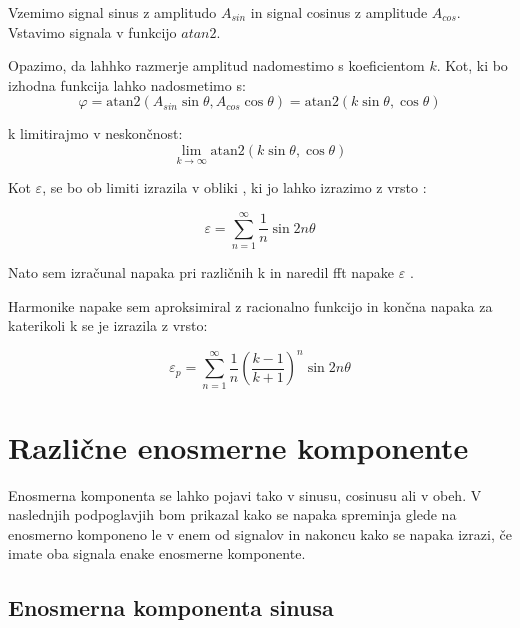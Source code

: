 Vzemimo signal sinus z amplitudo $A_{sin}$ in signal cosinus z amplitude $A_{cos}$. Vstavimo signala v funkcijo $atan2$.

Opazimo, da lahhko razmerje amplitud nadomestimo s koeficientom $k$. Kot, ki bo izhodna funkcija lahko nadosmetimo s:
\begin{equation}
\varphi =  \mathrm{atan2}(A_{sin} \sin{\theta}, A_{cos} \cos{\theta}) = \mathrm{atan2}(k \sin{\theta},\cos{\theta})
\end{equation}

k limitirajmo v neskončnost:
\begin{equation}
\lim_{k \rightarrow \infty} \mathrm{atan2}(k \sin{\theta},\cos{\theta})
\end{equation}


Kot $\varepsilon$, se bo ob limiti  izrazila v obliki , ki jo lahko izrazimo z vrsto \cite{fourierova_vrsta}:

\begin{equation}
\varepsilon = \sum_{n=1}^{\infty}\frac{1}{n} \sin 2 n \theta
\end{equation}

Nato sem izračunal napaka pri različnih k in naredil fft napake $\varepsilon$ \cite{matlab_fft}.

Harmonike napake sem aproksimiral z racionalno funkcijo in končna napaka za katerikoli k se je izrazila z vrsto:

\begin{equation}
\label{vrsta_k}
\varepsilon_p =\sum_{n=1}^{\infty}\frac{1}{n}(\frac{k-1}{k+1})^n \sin 2 n \theta
\end{equation}

\newpage
\section{Različne enosmerne komponente}

Enosmerna komponenta se lahko pojavi tako v sinusu, cosinusu ali v obeh. V naslednjih podpoglavjih bom prikazal kako se napaka spreminja glede na enosmerno komponeno le v enem od signalov in nakoncu kako se napaka izrazi, če imate oba signala enake enosmerne komponente.

\subsection{Enosmerna komponenta sinusa}

